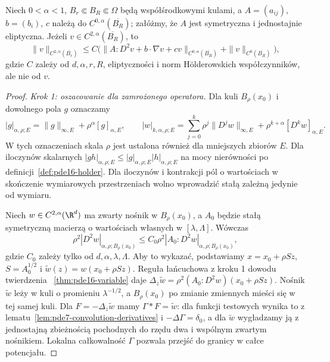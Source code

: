\begin{lemat}
\label{lem:pde16-schauder-apriori}
Niech $0<\alpha<1$, $B_r\Subset B_R\Subset\Omega$
będą współśrodkowymi kulami, a
$A=(a_{ij})$, $b=(b_i)$, $c$ należą do
$C^{0,\alpha}(\overline{B_R})$; załóżmy, że $A$ jest
symetryczna i jednostajnie eliptyczna.
Jeżeli $v\in C^{2,\alpha}(\overline{B_R})$, to
\begin{equation}\label{eq:pde16-schauder-apriori}
 \|v\|_{C^{2,\alpha}(\overline{B_r})}
 \le C\bigl(\|A:D^2v+b\cdot\nabla v+cv\|_{C^{0,\alpha}(\overline{B_R})}
 +\|v\|_{C^0(\overline{B_R})}\bigr),
\end{equation}
gdzie $C$ zależy od $d,\alpha,r,R$, eliptyczności i norm
Hölderowskich współczynników, ale nie od $v$.
\end{lemat}
\begin{proof}
\emph{Krok 1: oszacowanie dla zamrożonego operatora.}
Dla kuli $B_\rho(x_0)$ i dowolnego pola $g$ oznaczamy
\[
 |g|_{\alpha,\rho;E}=\|g\|_{\infty,E}
                    +\rho^\alpha[g]_{\alpha,E},
 \qquad
 |w|_{k,\alpha,\rho;E}
 =\sum_{j=0}^k\rho^j\|D^jw\|_{\infty,E}
       +\rho^{k+\alpha}[D^kw]_{\alpha,E}.
\]
W tych oznaczeniach skala $\rho$ jest ustalona również
dla mniejszych zbiorów $E$. Dla iloczynów skalarnych
$|gh|_{\alpha,\rho;E}\le
|g|_{\alpha,\rho;E}|h|_{\alpha,\rho;E}$ na mocy
nierówności po definicji~\ref{def:pde16-holder}.
Dla iloczynów i kontrakcji pól o wartościach w skończenie
wymiarowych przestrzeniach wolno wprowadzić stałą
zależną jedynie od wymiaru.

Niech $w\in C^{2,\alpha}(\R^d)$ ma zwarty nośnik
w $B_\rho(x_0)$, a $A_0$ będzie stałą symetryczną
macierzą o wartościach własnych w $[\lambda,\Lambda]$.
Wówczas
\begin{equation}\label{eq:pde16-frozen}
 \rho^2|D^2w|_{\alpha,\rho;B_\rho(x_0)}
 \le C_0\rho^2|A_0:D^2w|_{\alpha,\rho;B_\rho(x_0)},
\end{equation}
gdzie $C_0$ zależy tylko od $d,\alpha,\lambda,\Lambda$.
Aby to wykazać, podstawiamy $x=x_0+\rho S z$,
$S=A_0^{1/2}$ i $\widetilde w(z)=w(x_0+\rho Sz)$.
Reguła łańcuchowa z kroku 1 dowodu twierdzenia
~\ref{thm:pde16-variable} daje
$\Delta_z\widetilde w=\rho^2(A_0:D^2w)(x_0+\rho Sz)$.
Nośnik $\widetilde w$ leży w kuli o promieniu
$\lambda^{-1/2}$, a
$B_\rho(x_0)$ po zmianie zmiennych mieści się
w tej samej kuli.
Dla $F=-\Delta_z\widetilde w$ mamy
$\Gamma*F=\widetilde w$: dla funkcji testowych wynika to
z lematu~\ref{lem:pde7-convolution-derivatives}
i $-\Delta\Gamma=\delta_0$, a dla $\widetilde w$
wygładzamy ją z jednostajną zbieżnością pochodnych
do rzędu dwa i wspólnym zwartym nośnikiem.
Lokalna całkowalność $\Gamma$ pozwala przejść
do granicy w całce potencjału.


\end{proof}
